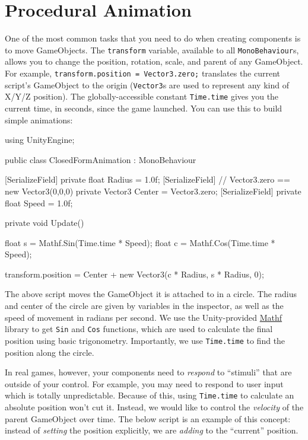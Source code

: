 \documentclass[11pt]{article}
\def\StartLineAt#1{\lstset{firstnumber=#1}}
\begin{document}
\section{Procedural Animation}

One of the most common tasks that you need to do when creating components is to move GameObjects.
The \lstinline|transform| variable, available to all \lstinline|MonoBehaviour|s, allows you to change
the position, rotation, scale, and parent of any GameObject.  For example, \lstinline|transform.position = Vector3.zero;|
translates the current script's GameObject to the origin (\lstinline|Vector3|s are used to represent
any kind of X/Y/Z position).  The globally-accessible constant \lstinline|Time.time| gives you the
current time, in seconds, since the game launched.  You can use this to build simple animations:

\StartLineAt{1}
\begin{csharp}
using UnityEngine;

public class ClosedFormAnimation : MonoBehaviour
{
    [SerializeField]
    private float Radius = 1.0f;
    [SerializeField]
    // Vector3.zero == new Vector3(0,0,0)
    private Vector3 Center = Vector3.zero;
    [SerializeField]
    private float Speed = 1.0f;

    private void Update()
    {
        float s = Mathf.Sin(Time.time * Speed);
        float c = Mathf.Cos(Time.time * Speed);

        transform.position = Center + new Vector3(c * Radius, s * Radius, 0);
    }
}
\end{csharp}

The above script moves the GameObject it is attached to in a circle.  The radius and center of the 
circle are given by variables in the inspector, as well as the speed of movement in radians per 
second.  We use the Unity-provided \href{https://docs.unity3d.com/ScriptReference/Mathf.html}{Mathf}
library to get \lstinline|Sin| and \lstinline|Cos| functions, which are used to calculate the final
position using basic trigonometry.  Importantly, we use \lstinline|Time.time| to find the position
along the circle.

In real games, however, your components need to \textit{respond} to ``stimuli'' that are outside of
your control.  For example, you may need to respond to user input which is totally unpredictable.
Because of this, using \lstinline|Time.time| to calculate an absolute position won't cut it.  Instead,
we would like to control the \textit{velocity} of the parent GameObject over time.  The below script
is an example of this concept: instead of \textit{setting} the position explicitly, we are \textit{adding}
to the ``current'' position.\pagebreak
\end{document}
